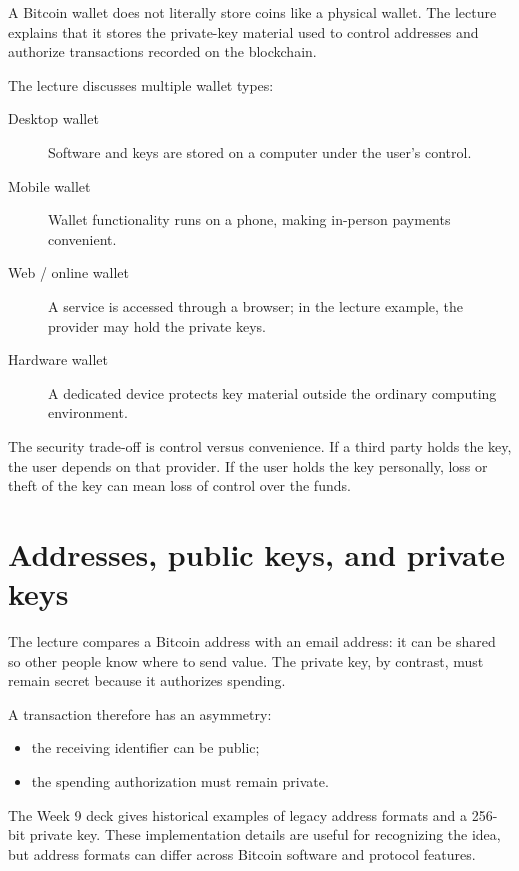 \begin{keyidea}
A Bitcoin wallet does not literally store coins like a physical wallet. The lecture explains that it stores the private-key material used to control addresses and authorize transactions recorded on the blockchain.
\end{keyidea}

The lecture discusses multiple wallet types:

\begin{description}
  \item[Desktop wallet] Software and keys are stored on a computer under the user's control.
  \item[Mobile wallet] Wallet functionality runs on a phone, making in-person payments convenient.
  \item[Web / online wallet] A service is accessed through a browser; in the lecture example, the provider may hold the private keys.
  \item[Hardware wallet] A dedicated device protects key material outside the ordinary computing environment.
\end{description}

The security trade-off is control versus convenience. If a third party holds the key, the user depends on that provider. If the user holds the key personally, loss or theft of the key can mean loss of control over the funds.

\section{Addresses, public keys, and private keys}

The lecture compares a Bitcoin address with an email address: it can be shared so other people know where to send value. The private key, by contrast, must remain secret because it authorizes spending.

A transaction therefore has an asymmetry:

\begin{itemize}
  \item the receiving identifier can be public;
  \item the spending authorization must remain private.
\end{itemize}

The Week 9 deck gives historical examples of legacy address formats and a 256-bit private key. These implementation details are useful for recognizing the idea, but address formats can differ across Bitcoin software and protocol features.

